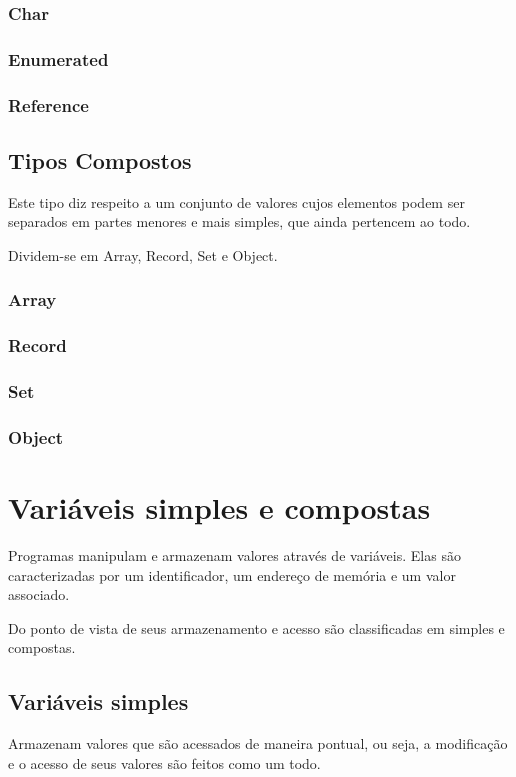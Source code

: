 \documentclass[brazil,times]{abnt}
\begin{document}
\subsection{Char} 
\subsection{Enumerated} 
\subsection{Reference} 

\section{Tipos Compostos}
Este tipo diz respeito a um conjunto de valores cujos elementos podem ser separados em partes menores e mais simples, que ainda pertencem ao todo.

Dividem-se em Array, Record, Set e Object.

\subsection{Array} 
\subsection{Record} 
\subsection{Set} 
\subsection{Object} 

\chapter{Variáveis simples e compostas}
Programas manipulam e armazenam valores através de variáveis. Elas são caracterizadas por um identificador, um endereço de memória e um valor associado.

Do ponto de vista de seus armazenamento e acesso são classificadas em simples e compostas.

\section{Variáveis simples}
Armazenam valores que são acessados de maneira pontual, ou seja, a modificação e o acesso de seus valores são feitos como um todo.
\end{document}
